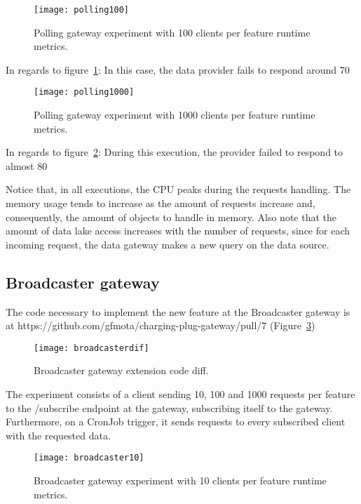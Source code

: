 \begin{figure}
    \centering
    \texttt{[image: polling100]}
    \caption{Polling gateway experiment with 100 clients per feature runtime metrics.\label{fig:polling100}}
\end{figure}

In regards to figure~\ref{fig:polling100}: In this case, the data provider fails to respond around 70%

\begin{figure}
    \centering
    \texttt{[image: polling1000]}
    \caption{Polling gateway experiment with 1000 clients per feature runtime metrics.\label{fig:polling1000}}
\end{figure}

In regards to figure~\ref{fig:polling1000}: During this execution, the provider failed to respond to almost 80%

Notice that, in all executions, the CPU peaks during the requests handling. The memory usage tends to increase as the amount of requests increase and, consequently, the amount of objects to handle in memory. Also note that the amount of data lake access increases with the number of requests, since for each incoming request, the data gateway makes a new query on the data source.

\subsection*{Broadcaster gateway}
\label{sec:broadcasterresult}

The code necessary to implement the new feature at the Broadcaster gateway is at https://github.com/gfmota/charging-plug-gateway/pull/7 (Figure~\ref{fig:broadcasterdif})

\begin{figure}
    \centering
    \texttt{[image: broadcasterdif]}
    \caption{Broadcaster gateway extension code diff.\label{fig:broadcasterdif}}
\end{figure}

The experiment consists of a client sending 10, 100 and 1000 requests per feature to the /subscribe endpoint at the gateway, subscribing itself to the gateway. Furthermore, on a CronJob trigger, it sends requests to every subscribed client with the requested data.

\begin{figure}
    \centering
    \texttt{[image: broadcaster10]}
    \caption{Broadcaster gateway experiment with 10 clients per feature runtime metrics.\label{fig:broadcaster10}}
\end{figure}

